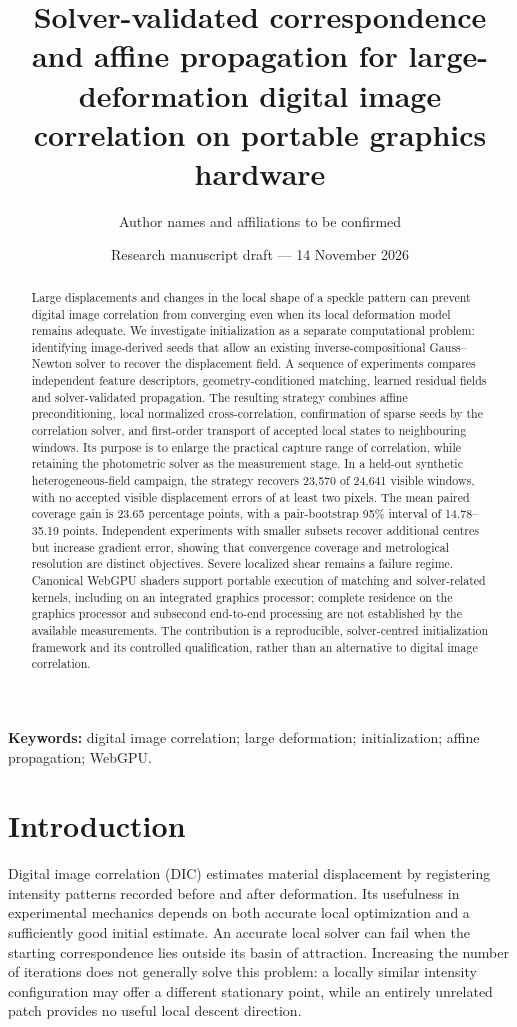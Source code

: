 \documentclass[11pt,a4paper]{article}
\title{Solver-validated correspondence and affine propagation for large-deformation digital image correlation on portable graphics hardware}
\author{Author names and affiliations to be confirmed}
\date{Research manuscript draft --- 14 November 2026}
\begin{document}
\maketitle
\begin{abstract}
Large displacements and changes in the local shape of a speckle pattern can prevent digital image correlation from converging even when its local deformation model remains adequate. We investigate initialization as a separate computational problem: identifying image-derived seeds that allow an existing inverse-compositional Gauss--Newton solver to recover the displacement field. A sequence of experiments compares independent feature descriptors, geometry-conditioned matching, learned residual fields and solver-validated propagation. The resulting strategy combines affine preconditioning, local normalized cross-correlation, confirmation of sparse seeds by the correlation solver, and first-order transport of accepted local states to neighbouring windows. Its purpose is to enlarge the practical capture range of correlation, while retaining the photometric solver as the measurement stage. In a held-out synthetic heterogeneous-field campaign, the strategy recovers 23,570 of 24,641 visible windows, with no accepted visible displacement errors of at least two pixels. The mean paired coverage gain is 23.65 percentage points, with a pair-bootstrap 95\% interval of 14.78--35.19 points. Independent experiments with smaller subsets recover additional centres but increase gradient error, showing that convergence coverage and metrological resolution are distinct objectives. Severe localized shear remains a failure regime. Canonical WebGPU shaders support portable execution of matching and solver-related kernels, including on an integrated graphics processor; complete residence on the graphics processor and subsecond end-to-end processing are not established by the available measurements. The contribution is a reproducible, solver-centred initialization framework and its controlled qualification, rather than an alternative to digital image correlation.
\end{abstract}
\noindent\textbf{Keywords:} digital image correlation; large deformation; initialization; affine propagation; WebGPU.

\section{Introduction}
Digital image correlation (DIC) estimates material displacement by registering intensity patterns recorded before and after deformation. Its usefulness in experimental mechanics depends on both accurate local optimization and a sufficiently good initial estimate. An accurate local solver can fail when the starting correspondence lies outside its basin of attraction. Increasing the number of iterations does not generally solve this problem: a locally similar intensity configuration may offer a different stationary point, while an entirely unrelated patch provides no useful local descent direction.
\end{document}
